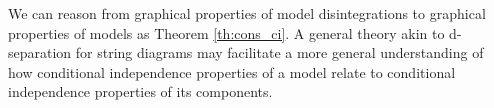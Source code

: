We can reason from graphical properties of model disintegrations to graphical properties of models as Theorem \ref{th:cons_ci}. A general theory akin to d-separation for string diagrams may facilitate a more general understanding of how conditional independence properties of a model relate to conditional independence properties of its components.







